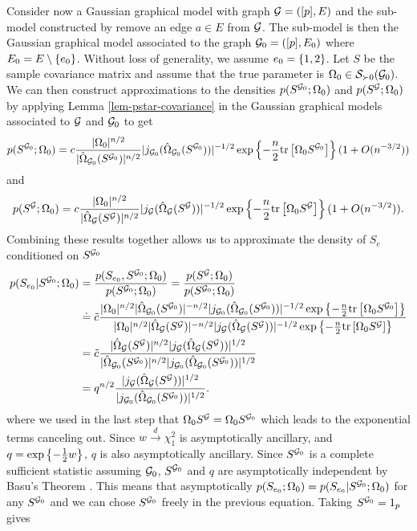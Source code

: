 Consider now a Gaussian graphical model with graph ${\mathcal{G}} = ([p], E)$ and the sub-model constructed by remove an edge $a \in E$ from ${\mathcal{G}}$. The sub-model is then the Gaussian graphical model associated to the graph ${\mathcal{G}}_0 = ([p], E_0)$ where $E_0 = E \setminus {\left\{e_0\right\}}$. Without loss of generality, we assume $e_0 = {\left\{1,2\right\}}$.
Let $S$ be the sample covariance matrix and assume that the true parameter is $\Omega_0 \in {\mathcal{S}}_{\succ 0}({\mathcal{G}}_0)$. We can then construct approximations to the densities $p(S^{{\mathcal{G}}_0}; \Omega_0)$ and $p(S^{{\mathcal{G}}}; \Omega_0)$ by applying Lemma \ref{lem-pstar-covariance} in the Gaussian graphical models associated to ${\mathcal{G}}$ and ${\mathcal{G}}_0$ to get
\begin{equation*}
    p(S^{{\mathcal{G}}_0}; \Omega_0) = c \frac{|\Omega_0|^{n/2}}{|\hat\Omega_{{\mathcal{G}}_0}(S^{{\mathcal{G}}_0})|^{n/2}} |j_{{\mathcal{G}}_0}(\hat\Omega_{{\mathcal{G}}_0}(S^{{\mathcal{G}}_0})) |^{-1/2} \exp\left\{-\frac{n}{2} {\textrm{tr}\left[\Omega_0 S^{{\mathcal{G}}_0}\right]}\right\} (1 + O(n^{-3/2}))
\end{equation*}
and
\begin{equation*}
    p(S^{\mathcal{G}}; \Omega_0) = c \frac{|\Omega_0|^{n/2}}{|\hat\Omega_{\mathcal{G}}(S^{\mathcal{G}})|^{n/2}} |j_{\mathcal{G}}(\hat\Omega_{\mathcal{G}}(S^{\mathcal{G}})) |^{-1/2} \exp\left\{-\frac{n}{2} {\textrm{tr}\left[\Omega_0 S^{\mathcal{G}}\right]}\right\} (1 + O(n^{-3/2})).
\end{equation*}
Combining these results together allows us to approximate the density of $S_e$ conditioned on $S^{{\mathcal{G}}_0}$
\begin{align*}
    p(S_{e_0}| S^{{\mathcal{G}}_0}; \Omega_0)
    &= \frac{p(S_{e_0}, S^{{\mathcal{G}}_0}; \Omega_0)}{p(S^{{\mathcal{G}}_0}; \Omega_0)} = \frac{p(S^{{\mathcal{G}}}; \Omega_0)}{p(S^{{\mathcal{G}}_0}; \Omega_0)}\\
    & \doteq \tilde c 
    \frac
        {|\Omega_0|^{n/2}|\hat\Omega_{{\mathcal{G}}_0}(S^{{\mathcal{G}}_0})|^{-n/2} |j_{{\mathcal{G}}_0}(\hat\Omega_{{\mathcal{G}}_0}(S^{{\mathcal{G}}_0})) |^{-1/2} \exp\left\{-\frac{n}{2} {\textrm{tr}\left[\Omega_0 S^{{\mathcal{G}}_0}\right]}\right\}}
        {|\Omega_0|^{n/2}|\hat\Omega_{\mathcal{G}}(S^{\mathcal{G}})|^{-n/2} |j_{\mathcal{G}}(\hat\Omega_{\mathcal{G}}(S^{\mathcal{G}})) |^{-1/2} \exp\left\{-\frac{n}{2} {\textrm{tr}\left[\Omega_0 S^{\mathcal{G}}\right]}\right\}}\\
    &= \tilde c 
    \frac
        {|\hat\Omega_{\mathcal{G}}(S^{\mathcal{G}})|^{n/2} |j_{\mathcal{G}}(\hat\Omega_{\mathcal{G}}(S^{\mathcal{G}})) |^{1/2}}    
        {|\hat\Omega_{{\mathcal{G}}_0}(S^{{\mathcal{G}}_0})|^{n/2} |j_{{\mathcal{G}}_0}(\hat\Omega_{{\mathcal{G}}_0}(S^{{\mathcal{G}}_0})) |^{1/2}}\\
    &= q^{n/2} \frac{|j_{\mathcal{G}}(\hat\Omega_{\mathcal{G}}(S^{\mathcal{G}})) |^{1/2}}    {|j_{{\mathcal{G}}_0}(\hat\Omega_{{\mathcal{G}}_0}(S^{{\mathcal{G}}_0})) |^{1/2}}.
\end{align*}
where we used in the last step that $\Omega_0 S^{\mathcal{G}} = \Omega_0 S^{{\mathcal{G}}_0}$ which leads to the exponential terms canceling out. Since $w \xrightarrow{d} \chi^2_1$ is asymptotically ancillary, and $q = \exp\left\{-\frac{1}{2} w\right\}$, $q$ is also asymptotically ancillary. Since $S^{{\mathcal{G}}_0}$ is a complete sufficient statistic assuming ${\mathcal{G}}_0$, $S^{{\mathcal{G}}_0}$ and $q$ are asymptotically independent by Basu's Theorem \cite{10.2307/25048259}. This means that asymptotically $p(S_{e_0}; \Omega_0) = p(S_{e_0} | S^{{\mathcal{G}}_0}; \Omega_0)$ for any $S^{{\mathcal{G}}_0}$ and we can chose $S^{{\mathcal{G}}_0}$ freely in the previous equation. Taking $S^{{\mathcal{G}}_0} = 1_p$ gives
